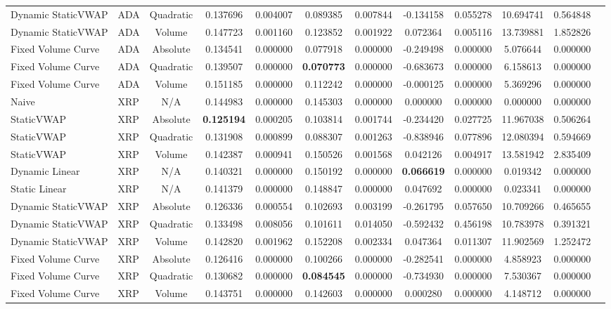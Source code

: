 \begin{table}[H]
{\begin{tabular}{llcccccccccc}
        Dynamic StaticVWAP & ADA & Quadratic & 0.137696 & 0.004007 & 0.089385 & 0.007844 & -0.134158 & 0.055278 & 10.694741 & 0.564848 \\
        Dynamic StaticVWAP & ADA & Volume & 0.147723 & 0.001160 & 0.123852 & 0.001922 & 0.072364 & 0.005116 & 13.739881 & 1.852826 \\
        Fixed Volume Curve & ADA & Absolute & 0.134541 & 0.000000 & 0.077918 & 0.000000 & -0.249498 & 0.000000 & 5.076644 & 0.000000 \\
        Fixed Volume Curve & ADA & Quadratic & 0.139507 & 0.000000 & \textbf{0.070773} & 0.000000 & -0.683673 & 0.000000 & 6.158613 & 0.000000 \\
        Fixed Volume Curve & ADA & Volume & 0.151185 & 0.000000 & 0.112242 & 0.000000 & -0.000125 & 0.000000 & 5.369296 & 0.000000 \\
        \hline
        Naive & XRP & N/A & 0.144983 & 0.000000 & 0.145303 & 0.000000 & 0.000000 & 0.000000 & 0.000000 & 0.000000 \\
        StaticVWAP & XRP & Absolute & \textbf{0.125194} & 0.000205 & 0.103814 & 0.001744 & -0.234420 & 0.027725 & 11.967038 & 0.506264 \\
        StaticVWAP & XRP & Quadratic & 0.131908 & 0.000899 & 0.088307 & 0.001263 & -0.838946 & 0.077896 & 12.080394 & 0.594669 \\
        StaticVWAP & XRP & Volume & 0.142387 & 0.000941 & 0.150526 & 0.001568 & 0.042126 & 0.004917 & 13.581942 & 2.835409 \\
        Dynamic Linear & XRP & N/A & 0.140321 & 0.000000 & 0.150192 & 0.000000 & \textbf{0.066619} & 0.000000 & 0.019342 & 0.000000 \\
        Static Linear & XRP & N/A & 0.141379 & 0.000000 & 0.148847 & 0.000000 & 0.047692 & 0.000000 & 0.023341 & 0.000000 \\
        Dynamic StaticVWAP & XRP & Absolute & 0.126336 & 0.000554 & 0.102693 & 0.003199 & -0.261795 & 0.057650 & 10.709266 & 0.465655 \\
        Dynamic StaticVWAP & XRP & Quadratic & 0.133498 & 0.008056 & 0.101611 & 0.014050 & -0.592432 & 0.456198 & 10.783978 & 0.391321 \\
        Dynamic StaticVWAP & XRP & Volume & 0.142820 & 0.001962 & 0.152208 & 0.002334 & 0.047364 & 0.011307 & 11.902569 & 1.252472 \\
        Fixed Volume Curve & XRP & Absolute & 0.126416 & 0.000000 & 0.100266 & 0.000000 & -0.282541 & 0.000000 & 4.858923 & 0.000000 \\
        Fixed Volume Curve & XRP & Quadratic & 0.130682 & 0.000000 & \textbf{0.084545} & 0.000000 & -0.734930 & 0.000000 & 7.530367 & 0.000000 \\
        Fixed Volume Curve & XRP & Volume & 0.143751 & 0.000000 & 0.142603 & 0.000000 & 0.000280 & 0.000000 & 4.148712 & 0.000000 \\
        \hline
        \end{tabular}
    }
    \label{tab:static_vwap_results_6}
\end{table}